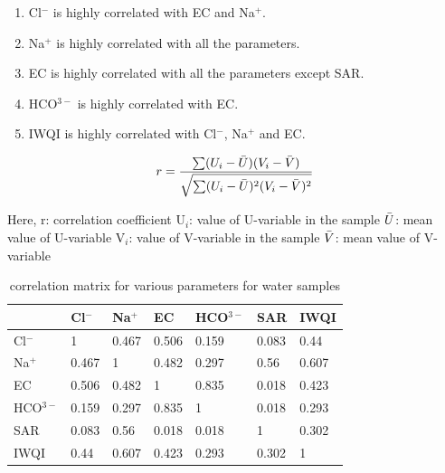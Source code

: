 \documentclass[conference]{IEEEtran}
\begin{document}
\begin{enumerate}
    \item Cl$^-$ is highly correlated with EC and Na$^+$.
    \item Na$^+$ is highly correlated with all the parameters.
    \item EC is highly correlated with all the parameters except SAR.
    \item HCO$^{3-}$ is highly correlated with EC.
    \item IWQI is highly correlated with Cl$^-$, Na$^+$ and EC.
\end{enumerate}



\begin{equation}
    r = \frac{\sum(U_i - \Bar{U})(V_i - \Bar{V})}{\sqrt{\sum(U_i - \Bar{U})^2(V_i - \Bar{V})^2}}
\label{equation:correlationMatrixOfIons&IWQI}
\end{equation}

Here, \newline
r: correlation coefficient \newline
U$_i$: value of U-variable in the sample \newline
$\Bar{U}$: mean value of U-variable \newline
V$_i$: value of V-variable in the sample \newline
$\Bar{V}$: mean value of V-variable


\begin{table}[h!]
    \centering
    \caption{correlation matrix for various parameters for water samples}
    \begin{tabular}{|l|l|l|l|l|l|l|}
    \hline
         & Cl$^-$ & Na$^+$ & EC & HCO$^{3-}$ & SAR & IWQI \\ \hline
        Cl$^-$ & 1 & 0.467 & 0.506 & 0.159 & 0.083 & 0.44 \\ \hline
        Na$^+$ & 0.467 & 1 & 0.482 & 0.297 & 0.56 & 0.607 \\ \hline
        EC & 0.506 & 0.482 & 1 & 0.835 & 0.018 & 0.423 \\ \hline
        HCO$^{3-}$ & 0.159 & 0.297 & 0.835 & 1 & 0.018 & 0.293 \\ \hline
        SAR & 0.083 & 0.56 & 0.018 & 0.018 & 1 & 0.302 \\ \hline
        IWQI & 0.44 & 0.607 & 0.423 & 0.293 & 0.302 & 1 \\ \hline
    \end{tabular}
    
    \label{table:correlationMatrixOfIons&IWQI}
\end{table}
\end{document}
